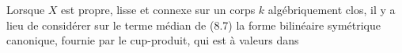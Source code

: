 Lorsque $X$ est  propre, lisse et connexe sur un corps $k$ algébriquement clos, il y a lieu de considérer sur le terme médian de (8.7) la forme bilinéaire symétrique canonique, fournie par le cup-produit, qui est à valeurs dans

